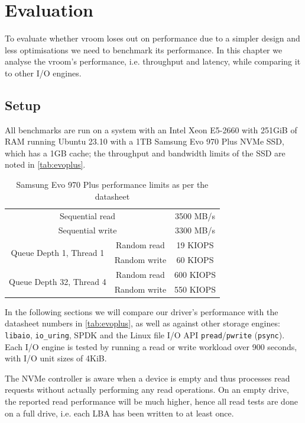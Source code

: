 \chapter{Evaluation}\label{chapter:eval}
To evaluate whether vroom loses out on performance due to a simpler design and less optimisations we need to benchmark its performance. In this chapter we analyse the vroom's performance, i.e. throughput and latency, while comparing it to other I/O engines.

\section{Setup}
All benchmarks are run on a system with an Intel Xeon E5-2660 with 251GiB of RAM running Ubuntu 23.10 with a 1TB Samsung Evo 970 Plus NVMe SSD, which has a 1GB cache; the throughput and bandwidth limits of the SSD are noted in \autoref{tab:evoplus}.

\begin{table}
    \centering
    \begin{tabular} { ||c|c|c|| }
        \cline{1-3}
        \multicolumn{2}{||c|}{Sequential read} & 3500 MB/s \\ \cline{1-3}
        \multicolumn{2}{||c|}{Sequential write} & 3300 MB/s \\ \cline{1-3}
        \multirow{2}{3cm}{Queue Depth 1, Thread 1} & Random read & 19 KIOPS \\ \cline{2-3}
                                                    & Random write & 60 KIOPS \\ \cline{1-3}
        \multirow{2}{3cm}{Queue Depth 32, Thread 4} & Random read & 600 KIOPS \\ \cline{2-3}
                                                    & Random write & 550 KIOPS \\ \cline{1-3}
    \end{tabular}
    \caption{Samsung Evo 970 Plus performance limits as per the datasheet \cite{ssd-datasheet}}
    \label{tab:evoplus}
\end{table}

In the following sections we will compare our driver's performance with the datasheet numbers in \autoref{tab:evoplus}, as well as against other storage engines: \texttt{libaio}, \texttt{io\_uring}, SPDK and the Linux file I/O API \texttt{pread}/\texttt{pwrite} (\texttt{psync}). Each I/O engine is tested by running a read or write workload over 900 seconds, with I/O unit sizes of 4KiB.

The NVMe controller is aware when a device is empty and thus processes read requests without actually performing any read operations. On an empty drive, the reported read performance will be much higher, hence all read tests are done on a full drive, i.e. each LBA has been written to at least once.

